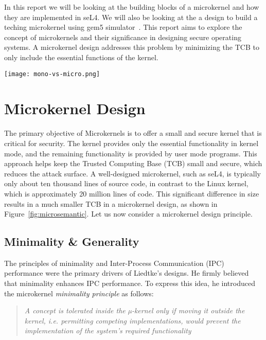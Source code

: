 \documentclass[
	a4paper, %
	11pt, %
	unnumberedsections, %
	twoside, %
]{LTJournalArticle}
\begin{document}
In this report we will be looking at the building blocks of a microkernel and how they are implemented in seL4. We will also be looking at the a design to build a teching microkernel using gem5 simulator~\cite{gem5}. This report aims to explore the concept of microkernels and their significance in designing secure operating systems. A microkernel design addresses this problem by minimizing the TCB to only include the essential functions of the kernel. 

\begin{figure*} %
	\texttt{[image: mono-vs-micro.png]}
	\caption{To left is a monolithic structure and microkernel structure on right~\cite{Heiser:2020}}
	\label{fig:microsemantic}
\end{figure*}

\section{Microkernel Design}

The primary objective of Microkernels is to offer a small and secure kernel that is critical for security. The kernel provides only the essential functionality in kernel mode, and the remaining functionality is provided by user mode programs. This approach helps keep the Trusted Computing Base (TCB) small and secure, which reduces the attack surface. A well-designed microkernel, such as seL4, is typically only about ten thousand lines of source code, in contrast to the Linux kernel, which is approximately 20 million lines of code. This significant difference in size results in a much smaller TCB in a microkernel design, as shown in Figure~\ref{fig:microsemantic}. Let us now consider a microkernel design principle.

\subsection{Minimality \& Generality}

The principles of minimality and Inter-Process Communication (IPC) performance were the primary drivers of Liedtke's designs. He firmly believed that minimality enhances IPC performance. To express this idea, he introduced the microkernel \textit{minimality principle} as follows:~\cite{Liedtke:1995}

\begin{quote}
\textit{A concept is tolerated inside the µ-kernel only if moving it outside the kernel, i.e. permitting competing implementations, would prevent the implementation of the system's required functionality}
\end{quote}
\end{document}
